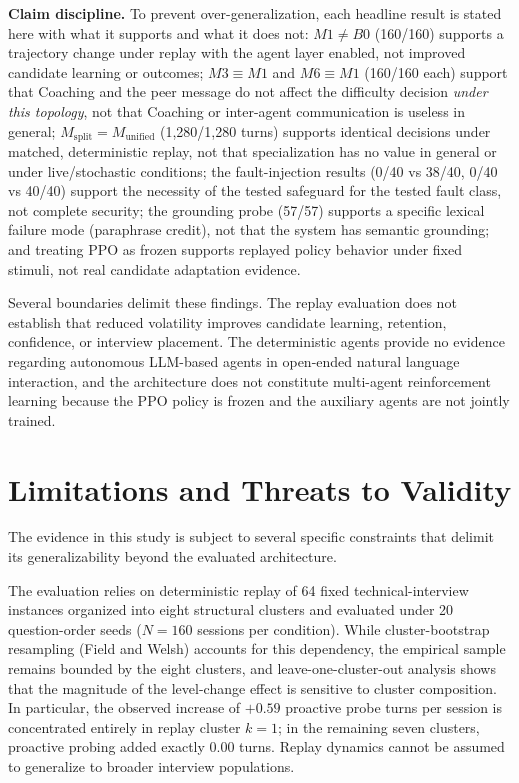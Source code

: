 \documentclass[runningheads]{llncs}
\begin{document}
\textbf{Claim discipline.} To prevent over-generalization, each headline result is stated here with what it supports and what it does not: $M1 \neq B0$ (160/160) supports a trajectory change under replay with the agent layer enabled, not improved candidate learning or outcomes; $M3 \equiv M1$ and $M6 \equiv M1$ (160/160 each) support that Coaching and the peer message do not affect the difficulty decision \emph{under this topology}, not that Coaching or inter-agent communication is useless in general; $M_{\mathrm{split}} = M_{\mathrm{unified}}$ (1,280/1,280 turns) supports identical decisions under matched, deterministic replay, not that specialization has no value in general or under live/stochastic conditions; the fault-injection results (0/40 vs 38/40, 0/40 vs 40/40) support the necessity of the tested safeguard for the tested fault class, not complete security; the grounding probe (57/57) supports a specific lexical failure mode (paraphrase credit), not that the system has semantic grounding; and treating PPO as frozen supports replayed policy behavior under fixed stimuli, not real candidate adaptation evidence.

Several boundaries delimit these findings. The replay evaluation does not establish that reduced volatility improves candidate learning, retention, confidence, or interview placement. The deterministic agents provide no evidence regarding autonomous LLM-based agents in open-ended natural language interaction, and the architecture does not constitute multi-agent reinforcement learning because the PPO policy is frozen and the auxiliary agents are not jointly trained.

\section{Limitations and Threats to Validity}

The evidence in this study is subject to several specific constraints that delimit its generalizability beyond the evaluated architecture.

The evaluation relies on deterministic replay of 64 fixed technical-interview instances organized into eight structural clusters and evaluated under 20 question-order seeds ($N=160$ sessions per condition). While cluster-bootstrap resampling (Field and Welsh) accounts for this dependency, the empirical sample remains bounded by the eight clusters, and leave-one-cluster-out analysis shows that the magnitude of the level-change effect is sensitive to cluster composition. In particular, the observed increase of $+0.59$ proactive probe turns per session is concentrated entirely in replay cluster $k=1$; in the remaining seven clusters, proactive probing added exactly 0.00 turns. Replay dynamics cannot be assumed to generalize to broader interview populations.
\end{document}
